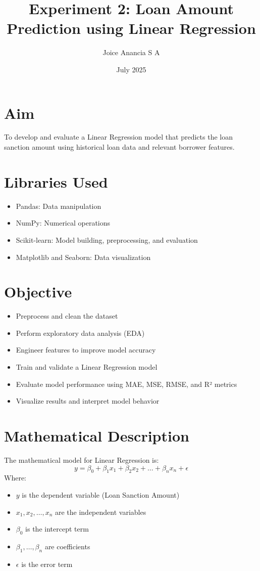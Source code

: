 \documentclass[12pt]{article}
\title{\textbf{Experiment 2: Loan Amount Prediction using Linear Regression}}
\author{Joice Anancia S A}
\date{July 2025}
\begin{document}
\maketitle

\section*{Aim}
To develop and evaluate a Linear Regression model that predicts the loan sanction amount using historical loan data and relevant borrower features.

\section*{Libraries Used}
\begin{itemize}
  \item Pandas: Data manipulation
  \item NumPy: Numerical operations
  \item Scikit-learn: Model building, preprocessing, and evaluation
  \item Matplotlib and Seaborn: Data visualization
\end{itemize}

\section*{Objective}
\begin{itemize}
  \item Preprocess and clean the dataset
  \item Perform exploratory data analysis (EDA)
  \item Engineer features to improve model accuracy
  \item Train and validate a Linear Regression model
  \item Evaluate model performance using MAE, MSE, RMSE, and R² metrics
  \item Visualize results and interpret model behavior
\end{itemize}

\section*{Mathematical Description}
The mathematical model for Linear Regression is:
\[
y = \beta_0 + \beta_1 x_1 + \beta_2 x_2 + \dots + \beta_n x_n + \epsilon
\]
Where:
\begin{itemize}
  \item $y$ is the dependent variable (Loan Sanction Amount)
  \item $x_1, x_2, \dots, x_n$ are the independent variables
  \item $\beta_0$ is the intercept term
  \item $\beta_1, \dots, \beta_n$ are coefficients
  \item $\epsilon$ is the error term
\end{itemize}
\end{document}
